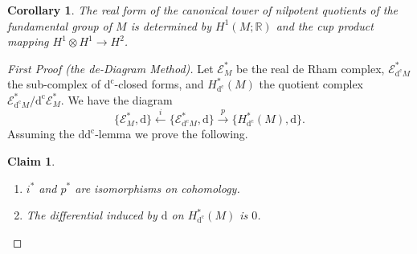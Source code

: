\documentclass[11pt]{amsart}
\theoremstyle{plain}
\newtheorem{corollary}[theorem]{Corollary}
\newtheorem{claim}{Claim}
\theoremstyle{definition}
\newcommand{\sE}{\mathscr{E}}
\newcommand{\dd}{\mathrm{d}}
\newcommand{\dc}{\mathrm{d}^{\mathrm{c}}}
\newcommand{\RR}{\mathbb{R}}
\begin{document}
\begin{corollary}
The real form of the canonical tower of nilpotent quotients of the fundamental group of $M$ is determined by $H^{1}(M; \RR)$ and the cup product mapping $H^{1} \otimes H^{1} \to H^{2}$.
\end{corollary}

\begin{proof}[First Proof (the de-Diagram Method)]
Let $\sE^{*}_{M}$ be the real de Rham complex, $\sE^{*}_{\dc M}$ the sub-complex of $\dc$-closed forms, and $H^{*}_{\dc}(M)$ the quotient complex $\sE^{*}_{\dc M}/\dc\sE^{*}_{M}$. We have the diagram
\[
\{\sE^{*}_{M}, \dd\} \xleftarrow{i} \{\sE^{*}_{\dc M}, \dd\} \xrightarrow{p} \{H^{*}_{\dc}(M), \dd\}.
\]
Assuming the $\dd\dc$-lemma we prove the following.

\begin{claim}%
\begin{enumerate}
\item $i^{*}$ and $p^{*}$ are isomorphisms on cohomology.
\item The differential induced by $\dd$ on $H^{*}_{\dc}(M)$ is $0$.
\end{enumerate}
\end{claim}


\end{proof}
\end{document}
